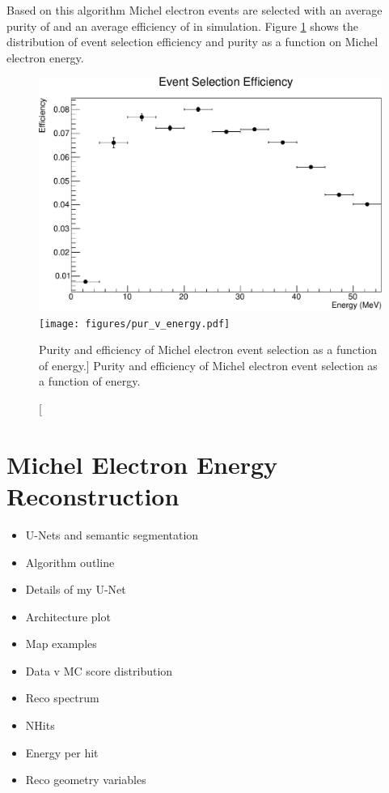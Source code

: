 Based on this algorithm Michel electron events are selected with an average
purity of  and an average efficiency of  
in \protodune{} simulation. Figure \ref{fig:efficiency_v_energy} shows the
distribution of event selection efficiency and purity as a function on Michel
electron energy. 
\begin{figure}
	\centering
	\includegraphics[width=\textwidth]{figures/eff_v_energy.pdf}
	\texttt{[image: figures/pur\_v\_energy.pdf]}
	\caption
	[Purity and efficiency of Michel electron event selection as a function of
	energy.]
	{Purity and efficiency of Michel electron event selection as a function of
	energy.}
	\label{fig:efficiency_v_energy}
\end{figure}


\section{Michel Electron Energy Reconstruction} \label{ME_R} 
\begin{mccorrection}
	\begin{itemize} 
	\item U-Nets and semantic segmentation
	\item Algorithm outline
	\item Details of my U-Net
	\item Architecture plot
	\item Map examples
	\item Data v MC score distribution
	\item Reco spectrum
	\item NHits
	\item Energy per hit
	\item Reco geometry variables
	\end{itemize}
\end{mccorrection}

